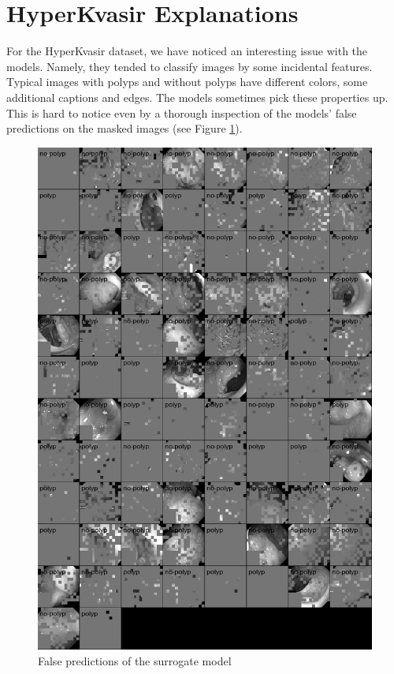 \documentclass[magisterska,en]{pracamgr}
\begin{document}
\section{HyperKvasir Explanations}\label{s:HyperKvasir Explanations}

For the HyperKvasir dataset, we have noticed an interesting issue with the models. Namely, they tended to classify images by some incidental features. Typical images with polyps and without polyps have different colors, some additional captions and edges. The models sometimes pick these properties up. This is hard to notice even by a thorough inspection of the models' false predictions on the masked images (see Figure \ref{gastro_vit_masked}).

\begin{figure}[H]
\centering
\includegraphics[scale=0.4]{./images/gastro_false_surrogate.png}
\caption{False predictions of the surrogate model}
\label{gastro_vit_masked}
\end{figure}
\end{document}

